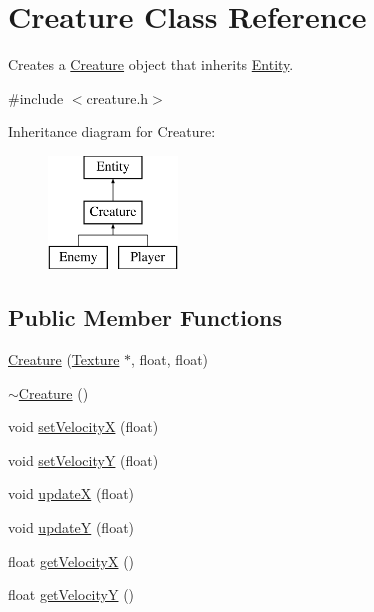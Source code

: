 \hypertarget{class_creature}{\section{Creature Class Reference}
\label{class_creature}
}


Creates a \hyperlink{class_creature}{Creature} object that inherits \hyperlink{class_entity}{Entity}.  




{\ttfamily \#include $<$creature.\+h$>$}

Inheritance diagram for Creature\+:\begin{figure}[H]
\begin{center}
\leavevmode
\includegraphics[height=3.000000cm]{class_creature}
\end{center}
\end{figure}
\subsection*{Public Member Functions}
\begin{DoxyCompactItemize}
\item 
\hyperlink{class_creature_a3512b75b90d921f17d098d55cc55a4c0}{Creature} (\hyperlink{class_texture}{Texture} $\ast$, float, float)
\item 
\hyperlink{class_creature_aa991b23f4813fbdb6f875204ed49814d}{$\sim$\+Creature} ()
\item 
void \hyperlink{class_creature_ab2ad7544f3c7fd24829c8c28ea5c667f}{set\+Velocity\+X} (float)
\item 
void \hyperlink{class_creature_a5aa971df9bf484d62fbe6413f01a661b}{set\+Velocity\+Y} (float)
\item 
void \hyperlink{class_creature_ac10e36c59bd7ec83708b46235aefbc33}{update\+X} (float)
\item 
void \hyperlink{class_creature_ab2bdf6ddfe183c828761bae1da81be47}{update\+Y} (float)
\item 
float \hyperlink{class_creature_a405b16c27bc5617e9c37ac01e166c785}{get\+Velocity\+X} ()
\item 
float \hyperlink{class_creature_a0ca2c7cccf8c8182dcad7a3b6737380b}{get\+Velocity\+Y} ()
\end{DoxyCompactItemize}
